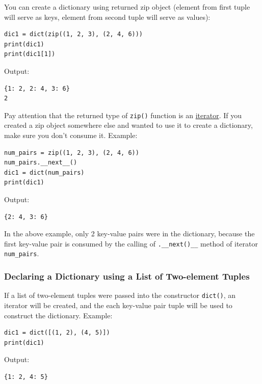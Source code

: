 \documentclass[12pt]{book}
\begin{document}
You can create a dictionary using returned zip object (element from first tuple will serve as keys, element from second tuple will serve as values):
\begin{verbatim}
dic1 = dict(zip((1, 2, 3), (2, 4, 6)))
print(dic1)
print(dic1[1])
\end{verbatim}
Output:
\begin{verbatim}
{1: 2, 2: 4, 3: 6}
2
\end{verbatim}

Pay attention that the returned type of \texttt{zip()} function is an \hyperref[org878dc67]{iterator}. If you created a zip object somewhere else and wanted to use it to create a dictionary, make sure you don't consume it. Example:
\begin{verbatim}
num_pairs = zip((1, 2, 3), (2, 4, 6))
num_pairs.__next__()
dic1 = dict(num_pairs)
print(dic1)
\end{verbatim}
Output:
\begin{verbatim}
{2: 4, 3: 6}
\end{verbatim}
In the above example, only 2 key-value pairs were in the dictionary, because the first key-value pair is consumed by the calling of \texttt{.\_\_next()\_\_} method of iterator \texttt{num\_pairs}.
\subsubsection{Declaring a Dictionary using a List of Two-element Tuples}
\label{sec:org472bcf7}
If a list of two-element tuples were passed into the constructor \texttt{dict()}, an iterator will be created, and the each key-value pair tuple will be used to construct the dictionary. Example:
\begin{verbatim}
dic1 = dict([(1, 2), (4, 5)])
print(dic1)
\end{verbatim}
Output:
\begin{verbatim}
{1: 2, 4: 5}
\end{verbatim}
\end{document}
